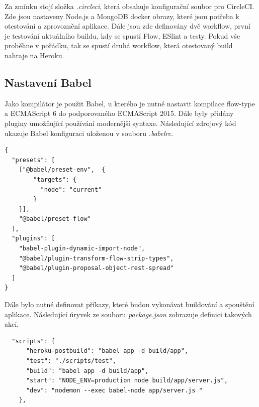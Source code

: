 \documentclass[thesis=M,czech]{FITthesis}[2018/10/20]
\begin{document}
Za zmínku stojí složka \textit{.circleci}, která obsahuje konfigurační soubor pro CircleCI. Zde jsou nastaveny Node.js a MongoDB docker obrazy, které jsou potřeba k otestování a zprovoznění aplikace. Dále jsou zde definovány dvě workflow, první je testování aktuálního buildu, kdy se spustí Flow, ESlint a testy. Pokud vše proběhne v pořádku, tak se spustí druhá workflow, která otestovaný build nahraje na Heroku.
\begin{figure}[H]
\end{figure}
\newpage
\subsection{Nastavení Babel}
Jako kompilátor je použit Babel, u kterého je nutné nastavit kompilace flow-type a ECMAScript 6 do podporovaného ECMAScript 2015. Dále byly přidány pluginy umožňující používání modernější syntaxe. Následující zdrojový kód ukazuje Babel konfiguraci uloženou v souboru \textit{.babelrc}.
\begin{lstlisting}
{
  "presets": [
    ["@babel/preset-env",  {
        "targets": {
          "node": "current"
        }   
    }], 
    "@babel/preset-flow"
  ],  
  "plugins": [
    "babel-plugin-dynamic-import-node",
    "@babel/plugin-transform-flow-strip-types",
    "@babel/plugin-proposal-object-rest-spread"
  ]
}
\end{lstlisting}

Dále bylo nutné definovat příkazy, které budou vykonávat buildování a spouštění aplikace. Následující úryvek ze souboru \textit{package.json} zobrazuje definici takových akcí.

\begin{lstlisting}
  "scripts": {
      "heroku-postbuild": "babel app -d build/app",
      "test": "./scripts/test",
      "build": "babel app -d build/app",
      "start": "NODE_ENV=production node build/app/server.js",
      "dev": "nodemon --exec babel-node app/server.js "
    },  
\end{lstlisting}
\end{document}
